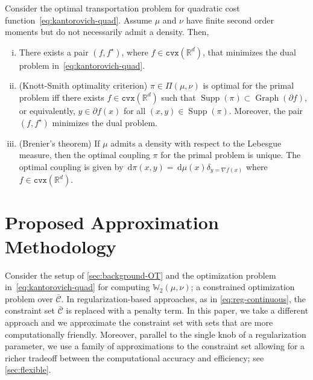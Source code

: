 \documentclass[10pt]{article}
\newcommand{\ud}{\,\mathrm{d}}
\newcommand{\op}[1]{\operatorname{#1}}
\newcommand{\cvx}{\mathtt{cvx}}
\newcommand{\real}{\mathbb{R}}
\newcommand{\W}{\mathds{W}}
\newcommand{\calC}{\mathcal{C}}
\numberwithin{equation}{section}
\begin{document}
\begin{theorem}\label{thm:Brenier-main}
	Consider the optimal transportation problem for quadratic cost function~\eqref{eq:kantorovich-quad}. Assume $\mu$ and $\nu$ have finite second order moments but do not necessarily admit a density. Then, 
	\begin{enumerate}[(i)]

		\item \label{thm:Brenier-main-1}
		There exists a pair $(f,f^\star)$, where $f \in \cvx(\real^d)$, that minimizes the dual problem in~\eqref{eq:kantorovich-quad}.

		\item \label{thm:Brenier-main-2}
(Knott-Smith optimality criterion) $\pi \in \Pi(\mu,\nu)$ is optimal for the primal problem iff there exists $f \in \cvx(\real^d)$ such that $\op{Supp}(\pi) \subset \op{Graph}(\partial f)$, or equivalently, $y \in \partial f(x)$ for all $(x,y) \in \op{Supp}(\pi)$. Moreover, the pair $(f,f^\star)$ minimizes the dual problem. 
		
		\item \label{thm:Brenier-main-3}
		(Brenier's theorem) If $\mu$ admits a density with respect to the Lebesgue measure, then the optimal coupling $\pi$ for the primal problem is unique. The optimal coupling is given by $\ud \pi(x,y) = \ud \mu(x) \delta_{y=\nabla f(x)}$ where $f \in \cvx(\real^d)$. 
	\end{enumerate}
\end{theorem}

\section{Proposed Approximation Methodology}\label{sec:restr-cvx}
Consider the setup of \autoref{sec:background-OT} and the optimization problem in~\eqref{eq:kantorovich-quad} for computing $\W_2(\mu,\nu)$; a constrained optimization problem over $\bar{\calC}$. In regularization-based approaches, as in \eqref{eq:reg-continuous}, the constraint set $\bar{\calC}$ is replaced with a penalty term. In this paper, we take a different approach and we approximate the constraint set with sets that are more computationally friendly. Moreover, parallel to the single knob of a regularization parameter, we use a family of approximations to the constraint set allowing for a richer tradeoff between the computational accuracy and efficiency; see \autoref{sec:flexible}. 
\end{document}
